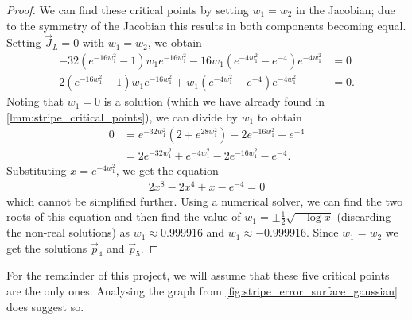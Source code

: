 \begin{proof}
    We can find these critical points by setting $w_1=w_2$ in the Jacobian;
    due to the symmetry of the Jacobian this results in both components becoming equal. 
    Setting $\vec{J}_L=0$ with $w_1=w_2$, we obtain
    \begin{align*}
        -32 \left(e^{-16 w_1^2} - 1\right) w_1 e^{-16w_1^2}
        -16 w_1 \left(e^{-4 w_1^2} - e^{-4}\right) e^{-4 w_1^2}
        &= 0 \\
        2 \left(e^{-16 w_1^2} - 1\right) w_1 e^{-16w_1^2}
        + w_1 \left(e^{-4 w_1^2} - e^{-4}\right) e^{-4 w_1^2} &= 0.
    \end{align*}
    Noting that $w_1=0$ is a solution (which we have already found in \ref{lmm:stripe_critical_points}), we can divide by $w_1$ to obtain
    \begin{align*}
        0&= e^{-32 w_1^2} \left(2 + e^{28 w_1^2}\right) - 2 e^{-16 w_1^2} - e^{-4} \\
        &= 2 e^{-32 w_1^2} + e^{-4 w_1^2} - 2 e^{-16 w_1^2} - e^{-4}.
    \end{align*}
    Substituting $x = e^{-4w_1^2}$, we get the equation
    \begin{align*}
        2x^8 - 2x^4 + x - e^{-4} = 0
    \end{align*}
    which cannot be simplified further.
    Using a numerical solver, we can find the two roots of this equation and then find the value of $w_1=\pm \frac{1}{2} \sqrt{-\log x}$ (discarding the non-real solutions) as $w_1\approx0.999916$ and $w_1\approx-0.999916$.
    Since $w_1=w_2$ we get the solutions $\vec{p}_4$ and $\vec{p}_5$.
\end{proof}

For the remainder of this project, we will assume that these five critical points are the only ones. 
Analysing the graph from \ref{fig:stripe_error_surface_gaussian} does suggest so.

